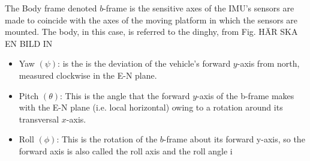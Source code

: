 The Body frame denoted $b$-frame is the sensitive axes of the IMU's sensors are made to coincide with the axes of the moving platform in which the sensors are mounted. The body, in this case, is referred to the dinghy, from Fig. HÄR SKA EN BILD IN
\begin{itemize}
\item Yaw $(\psi)$: is the is the deviation of the vehicle’s forward $y$-axis from north, measured clockwise in the E-N plane.
\item Pitch $(\theta)$: This is the angle that the forward $y$-axis of the b-frame makes with the
E-N plane (i.e. local horizontal) owing to a rotation around its transversal $x$-axis.
\item Roll $(\phi)$: This is the rotation of the $b$-frame about its forward y-axis, so the
forward axis is also called the roll axis and the roll angle i
\end{itemize}

